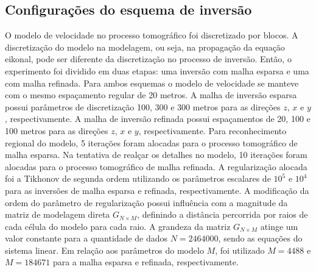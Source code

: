 \subsection{Configurações do esquema de inversão}

O modelo de velocidade no processo tomográfico foi discretizado por blocos. A discretização do modelo na modelagem, ou seja, na propagação da equação eikonal, pode ser diferente da discretização no processo de inversão. Então, o experimento foi dividido em duas etapas: uma inversão com malha esparsa e uma com malha refinada. Para ambos esquemas o modelo de velocidade se manteve com o mesmo espaçamento regular de 20 metros. A malha de inversão esparsa possui parâmetros de discretização 100, 300 e 300 metros para as direções $z$, $x$ e $y$, respectivamente. A malha de inversão refinada possui espaçamentos de 20, 100 e 100 metros para as direções $z$, $x$ e $y$, respectivamente. Para reconhecimento regional do modelo, 5 iterações foram alocadas para o processo tomográfico de malha esparsa. Na tentativa de realçar os detalhes no modelo, 10 iterações foram alocadas para o processo tomográfico de malha refinada. A regularização alocada foi a Tikhonov de segunda ordem utilizando os parâmetros escalares de $10^5$ e $10^4$ para as inversões de malha esparsa e refinada, respectivamente. A modificação da ordem do parâmetro de regularização possui influência com a magnitude da matriz de modelagem direta $G_{N\times M}$, definindo a distância percorrida por raios de cada célula do modelo para cada raio. A grandeza da matriz $G_{N\times M}$ atinge um valor constante para a quantidade de dados $N = 2464000$, sendo as equações do sistema linear. Em relação aos parâmetros do modelo $M$, foi utilizado $M = 4488$ e $M = 184671$ para a malha esparsa e refinada, respectivamente.   







